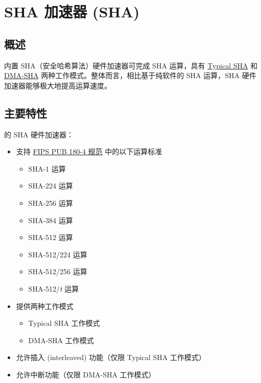 \documentclass[main\_\_CN.tex]{subfiles}
\begin{document}

\ifglobal
\else
    \listoftodos
    {\let\clearpage\relax \listofdonetodos}
    \tableofcontents
\fi




\hypertarget{sha}{}
\chapter{SHA 加速器 (SHA)} \label{mod:sha}

\section{概述}

\chipname{} 内置 SHA（安全哈希算法）硬件加速器可完成 SHA 运算，具有 \hyperref[sec:sha-typical-sha]{Typical SHA} 和 \hyperref[sec:sha-dma-sha]{DMA-SHA} 两种工作模式。整体而言，相比基于纯软件的 SHA 运算，SHA 硬件加速器能够极大地提高运算速度。

\section{主要特性}

\chipname{} 的 SHA 硬件加速器：

\begin{itemize}
    \item 支持 \href{https://doi.org/10.6028/NIST.FIPS.180-4}{FIPS PUB 180-4 规范} 中的以下运算标准
    \begin{itemize}
        \item SHA-1 运算
        \item SHA-224 运算
        \item SHA-256 运算
        \item SHA-384 运算
        \item SHA-512 运算
        \item SHA-512/224 运算
        \item SHA-512/256 运算
        \item SHA-512/{\it{t}} 运算
    \end{itemize}
    \item 提供两种工作模式
    \begin{itemize}
        \item Typical SHA 工作模式
        \item DMA-SHA 工作模式
    \end{itemize}
    \item 允许插入 (interleaved) 功能（仅限 Typical SHA 工作模式）
    \item 允许中断功能（仅限 DMA-SHA 工作模式）
\end{itemize}
\end{document}
